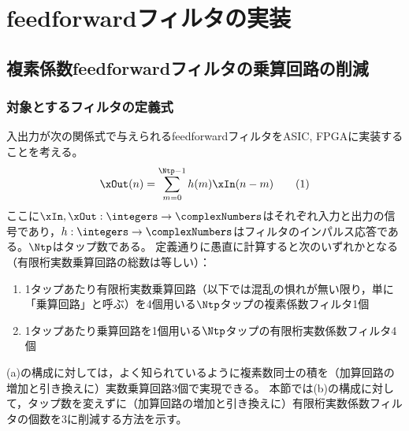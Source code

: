 \section{feedforwardフィルタの実装}
    \subsection{複素係数feedforwardフィルタの乗算回路の削減}
        \subsubsection{対象とするフィルタの定義式}
            入出力が次の関係式で与えられるfeedforwardフィルタをASIC, FPGAに実装することを考える。
            \[ \xOut(n) = \sum_{m=0}^{\Ntp-1} h(m)\xIn(n-m) \tag{1} \]
            ここに$\xIn,\xOut:\integers\to\complexNumbers$はそれぞれ入力と出力の信号であり，$h:\integers\to\complexNumbers$はフィルタのインパルス応答である。$\Ntp$はタップ数である。
            定義通りに愚直に計算すると次のいずれかとなる（有限桁実数乗算回路の総数は等しい）：
            \begin{enumerate}[label=(\alph*)]
                \item 1タップあたり有限桁実数乗算回路（以下では混乱の惧れが無い限り，単に「乗算回路」と呼ぶ）を4個用いる$\Ntp$タップの複素係数フィルタ1個
                \item 1タップあたり乗算回路を1個用いる$\Ntp$タップの有限桁実数係数フィルタ4個
            \end{enumerate}
            (a)の構成に対しては，よく知られているように複素数同士の積を（加算回路の増加と引き換えに）実数乗算回路3個で実現できる。
            本節では(b)の構成に対して，タップ数を変えずに（加算回路の増加と引き換えに）有限桁実数係数フィルタの個数を3に削減する方法を示す。
